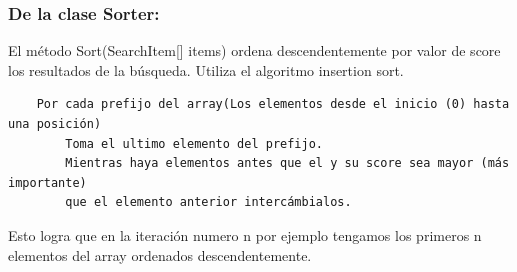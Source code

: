 \documentclass{article}
\begin{document}
\subsubsection{De la clase Sorter:}
El método Sort(SearchItem[] items) ordena descendentemente por valor de score los resultados de la búsqueda. Utiliza el algoritmo insertion sort.\\
\begin{verbatim}
    Por cada prefijo del array(Los elementos desde el inicio (0) hasta una posición)
        Toma el ultimo elemento del prefijo.
        Mientras haya elementos antes que el y su score sea mayor (más importante) 
        que el elemento anterior intercámbialos.  
\end{verbatim}
Esto logra que en la iteración numero n por ejemplo tengamos los primeros n elementos del array ordenados descendentemente.\\
\end{document}
